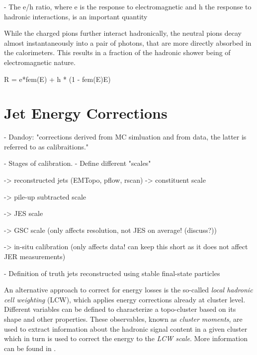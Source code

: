 - The e/h ratio, where e is the response to electromagnetic and h the response to hadronic interactions, is an important quantity


While the charged pions further interact hadronically, the neutral pions decay almost instantaneously into a pair of photons, that are more directly absorbed in the calorimeters. This results in a fraction of the hadronic shower being of electromagnetic nature.

R = e*fem(E) + h * (1 - fem(E)E)



\section{Jet Energy Corrections}

- Dandoy: "corrections derived from MC simluation and from data, the latter is referred to as \insitu calibraitions."

- Stages of calibration.
- Define different "scales"

-> reconstructed jets (EMTopo, pflow, rscan) -> constituent scale

-> pile-up subtracted scale

-> JES scale

-> GSC scale (only affects resolution, not JES on average! (discuss?))

-> in-situ calibration (only affects data! can keep this short as it does not affect JER measurements)


- Definition of truth jets reconstructed using stable final-state particles



An alternative approach to correct for energy losses is the so-called \emph{local hadronic cell weighting} (LCW), which applies energy corrections already at cluster level. Different variables can be defined to characterize a topo-cluster based on its shape and other properties. These observables, known as \emph{cluster moments}, are used to extract information about the hadronic signal content in a given cluster which in turn is used to correct the energy to the \emph{LCW scale}. More information can be found in .

